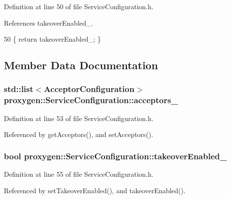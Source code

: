 Definition at line 50 of file Service\+Configuration.\+h.



References takeover\+Enabled\+\_\+.


\begin{DoxyCode}
50 \{ \textcolor{keywordflow}{return} takeoverEnabled_; \}
\end{DoxyCode}


\subsection{Member Data Documentation}
\subsubsection[{acceptors\+\_\+}]{\setlength{\rightskip}{0pt plus 5cm}std\+::list$<${\bf Acceptor\+Configuration}$>$ proxygen\+::\+Service\+Configuration\+::acceptors\+\_\+\hspace{0.3cm}{\ttfamily [private]}}\label{classproxygen_1_1ServiceConfiguration_a32e1ae5f1e34b47623c6a9bec9fba12c}


Definition at line 53 of file Service\+Configuration.\+h.



Referenced by get\+Acceptors(), and set\+Acceptors().

\subsubsection[{takeover\+Enabled\+\_\+}]{\setlength{\rightskip}{0pt plus 5cm}bool proxygen\+::\+Service\+Configuration\+::takeover\+Enabled\+\_\+\hspace{0.3cm}{\ttfamily [private]}}\label{classproxygen_1_1ServiceConfiguration_af0f1954372b8e186e19fab0310dd0614}


Definition at line 55 of file Service\+Configuration.\+h.



Referenced by set\+Takeover\+Enabled(), and takeover\+Enabled().

